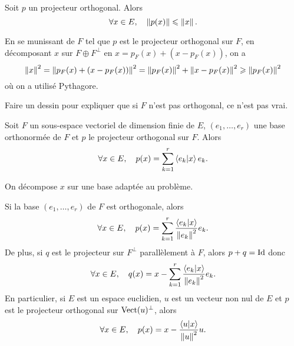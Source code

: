 \documentclass{magnolia}
\begin{document}

\begin{proposition}[utile=-3]
  Soit $p$ un projecteur orthogonal. Alors
  \[\forall x\in E ,\quad \left\|p(x)\right\|\leqslant\left\|x\right\|.\]
  \end{proposition}
  
  \begin{preuve}
  En se munissant de $F$ tel que $p$ est le projecteur orthogonal sur $F$, en décomposant $x$ sur $F\oplus F^\perp$ en $x=p_F(x)+(x-p_F(x))$, on a $$\left\|x\right\|^2=\left\|p_F(x)+(x-p_F(x))\right\|^2=\left\|p_F(x)\right\|^2+\left\|x-p_F(x)\right\|^2\geqslant \left\|p_F(x)\right\|^2$$ où on a utilisé Pythagore.
  \end{preuve}
  
  \begin{sol}
  Faire un dessin pour expliquer que si $F$ n'est pas orthogonal, ce n'est pas vrai.
  \end{sol}
  
  \begin{proposition}[utile=3]
  Soit $F$ un sous-espace vectoriel de dimension finie de $E$, $(e_1,\ldots,e_r)$ une base orthonormée
  de $F$ et $p$ le projecteur orthogonal sur $F$. Alors
  \[\forall x\in E ,\quad p(x)=\sum_{k=1}^r \left\langle {e_k}\middle|{x}\right\rangle e_k.\]
  \end{proposition}
  
  \begin{preuve}
  On décompose $x$ sur une base adaptée au problème.
  \end{preuve}
  
  \begin{remarques}
  \remarque Si la base $(e_1,\ldots,e_r)$ de $F$ est orthogonale, alors
    \[\forall x\in E,\quad p(x)=\sum_{k=1}^r \frac{\left\langle {e_k}\middle|{x}\right\rangle}{\left\|e_k\right\|^2}e_k.\]
    De plus, si $q$ est le projecteur sur $F^\perp$ parallèlement à $F$, alors $p+q=\operatorname{Id}$ donc 
    \[\forall x\in E,\quad q(x)=x-\sum_{k=1}^r \frac{\left\langle {e_k}\middle|{x}\right\rangle}{\left\|e_k\right\|^2}e_k.\]
  \remarque En particulier, si $E$ est un espace euclidien, $u$ est un vecteur non nul de $E$ et
    $p$ est le projecteur orthogonal sur $\operatorname{Vect}(u)^\perp$, alors
    \[\forall x\in E,\quad p(x)=x-\frac{\left\langle {u}\middle|{x}\right\rangle}{\left\|u\right\|^2}u.\]
  \end{remarques}
  
\end{document}
